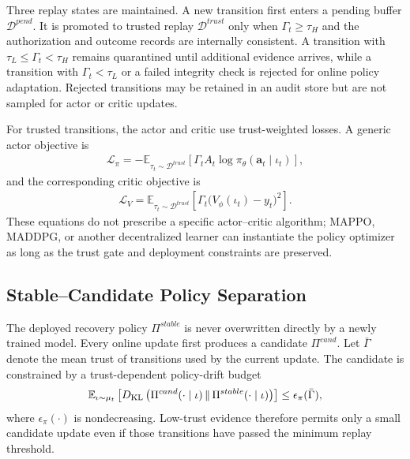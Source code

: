 Three replay states are maintained. A new transition first enters a pending buffer $\mathcal{D}^{pend}$. It is promoted to trusted replay $\mathcal{D}^{trust}$ only when $\Gamma_t\ge\tau_H$ and the authorization and outcome records are internally consistent. A transition with $\tau_L\le\Gamma_t<\tau_H$ remains quarantined until additional evidence arrives, while a transition with $\Gamma_t<\tau_L$ or a failed integrity check is rejected for online policy adaptation. Rejected transitions may be retained in an audit store but are not sampled for actor or critic updates.

For trusted transitions, the actor and critic use trust-weighted losses. A generic actor objective is
\begin{align}
\label{eq-trust-actor-loss}
\mathcal{L}_{\pi}=
-\mathbb{E}_{\tau_t\sim\mathcal{D}^{trust}}
\left[\Gamma_t A_t\log\pi_\theta(\mathbf{a}_t\mid\iota_t)\right],
\end{align}
and the corresponding critic objective is
\begin{align}
\label{eq-trust-critic-loss}
\mathcal{L}_{V}=
\mathbb{E}_{\tau_t\sim\mathcal{D}^{trust}}
\left[\Gamma_t\big(V_\phi(\iota_t)-y_t\big)^2\right].
\end{align}
These equations do not prescribe a specific actor--critic algorithm; MAPPO, MADDPG, or another decentralized learner can instantiate the policy optimizer as long as the trust gate and deployment constraints are preserved.

\subsection{Stable--Candidate Policy Separation}
The deployed recovery policy $\Pi^{stable}$ is never overwritten directly by a newly trained model. Every online update first produces a candidate $\Pi^{cand}$. Let $\bar\Gamma$ denote the mean trust of transitions used by the current update. The candidate is constrained by a trust-dependent policy-drift budget
\begin{align}
\label{eq-trust-kl-budget}
\mathbb{E}_{\iota\sim\mu_t}
\left[D_{\rm KL}\left(
\Pi^{cand}(\cdot\mid\iota)\,\|\,\Pi^{stable}(\cdot\mid\iota)
\right)\right]
\le\epsilon_\pi(\bar\Gamma),
\end{align}
where $\epsilon_\pi(\cdot)$ is nondecreasing. Low-trust evidence therefore permits only a small candidate update even if those transitions have passed the minimum replay threshold.

